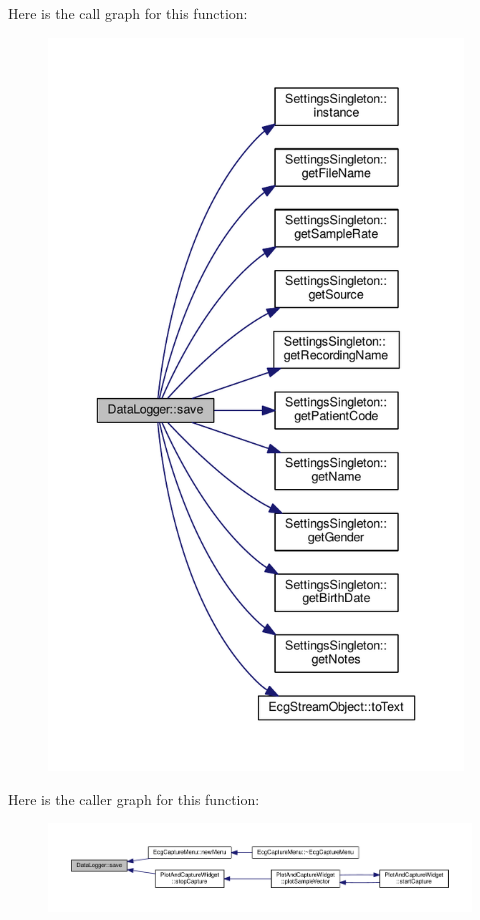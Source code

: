Here is the call graph for this function\+:\nopagebreak
\begin{figure}[H]
\begin{center}
\leavevmode
\includegraphics[height=550pt]{classDataLogger_a17296a2d3088e979c9b1f48e68caf9ad_cgraph}
\end{center}
\end{figure}




Here is the caller graph for this function\+:\nopagebreak
\begin{figure}[H]
\begin{center}
\leavevmode
\includegraphics[width=350pt]{classDataLogger_a17296a2d3088e979c9b1f48e68caf9ad_icgraph}
\end{center}
\end{figure}


